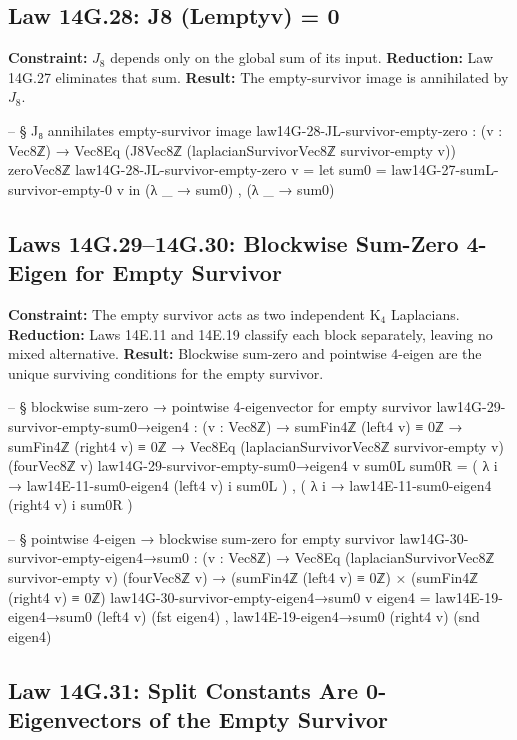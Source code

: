 \documentclass[11pt,a4paper]{book}
\def\Leftrightarrow{<=>}%
\def\mathrm#1{#1}%
\def\texorpdfstring#1#2{#2}%
\begin{document}
\subsection{Law 14G.28: \texorpdfstring{$J_8 (L_{\mathrm{empty}}\,v) = 0$}{J8 (Lemptyv) = 0}}

\textbf{Constraint:} $J_8$ depends only on the global sum of its input.
\textbf{Reduction:} Law 14G.27 eliminates that sum.
\textbf{Result:} The empty-survivor image is annihilated by $J_8$.

\begin{code}
-- § J₈ annihilates empty-survivor image
law14G-28-JL-survivor-empty-zero : (v : Vec8ℤ) → Vec8Eq (J8Vec8ℤ (laplacianSurvivorVec8ℤ survivor-empty v)) zeroVec8ℤ
law14G-28-JL-survivor-empty-zero v =
  let sum0 = law14G-27-sumL-survivor-empty-0 v in
  (λ _ → sum0) , (λ _ → sum0)
\end{code}

\subsection{Laws 14G.29--14G.30: Blockwise Sum-Zero \texorpdfstring{$\Leftrightarrow$}{} 4-Eigen for Empty Survivor}

\textbf{Constraint:} The empty survivor acts as two independent K$_4$ Laplacians.
\textbf{Reduction:} Laws 14E.11 and 14E.19 classify each block separately, leaving no mixed alternative.
\textbf{Result:} Blockwise sum-zero and pointwise $4$-eigen are the unique surviving conditions for the empty survivor.

\begin{code}
-- § blockwise sum-zero → pointwise 4-eigenvector for empty survivor
law14G-29-survivor-empty-sum0→eigen4 : (v : Vec8ℤ) → sumFin4ℤ (left4 v) ≡ 0ℤ → sumFin4ℤ (right4 v) ≡ 0ℤ →
  Vec8Eq (laplacianSurvivorVec8ℤ survivor-empty v) (fourVec8ℤ v)
law14G-29-survivor-empty-sum0→eigen4 v sum0L sum0R =
  ( λ i → law14E-11-sum0-eigen4 (left4 v) i sum0L ) ,
  ( λ i → law14E-11-sum0-eigen4 (right4 v) i sum0R )

-- § pointwise 4-eigen → blockwise sum-zero for empty survivor
law14G-30-survivor-empty-eigen4→sum0 : (v : Vec8ℤ) → Vec8Eq (laplacianSurvivorVec8ℤ survivor-empty v) (fourVec8ℤ v) →
  (sumFin4ℤ (left4 v) ≡ 0ℤ) × (sumFin4ℤ (right4 v) ≡ 0ℤ)
law14G-30-survivor-empty-eigen4→sum0 v eigen4 =
  law14E-19-eigen4→sum0 (left4 v) (fst eigen4) ,
  law14E-19-eigen4→sum0 (right4 v) (snd eigen4)
\end{code}

\subsection{Law 14G.31: Split Constants Are 0-Eigenvectors of the Empty Survivor}
\end{document}
